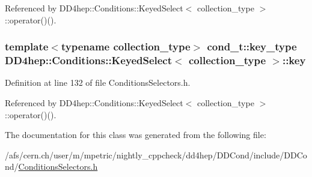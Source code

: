 Referenced by DD4hep::Conditions::KeyedSelect$<$ collection\_\-type $>$::operator()().\hypertarget{class_d_d4hep_1_1_conditions_1_1_keyed_select_aaa2b0dfe26393c92a82ff5c203c5398e}{
\subsubsection[{key}]{\setlength{\rightskip}{0pt plus 5cm}template$<$typename collection\_\-type$>$ {\bf cond\_\-t::key\_\-type} {\bf DD4hep::Conditions::KeyedSelect}$<$ collection\_\-type $>$::{\bf key}}}
\label{class_d_d4hep_1_1_conditions_1_1_keyed_select_aaa2b0dfe26393c92a82ff5c203c5398e}


Definition at line 132 of file ConditionsSelectors.h.

Referenced by DD4hep::Conditions::KeyedSelect$<$ collection\_\-type $>$::operator()().

The documentation for this class was generated from the following file:\begin{DoxyCompactItemize}
\item 
/afs/cern.ch/user/m/mpetric/nightly\_\-cppcheck/dd4hep/DDCond/include/DDCond/\hyperlink{_conditions_selectors_8h}{ConditionsSelectors.h}\end{DoxyCompactItemize}
